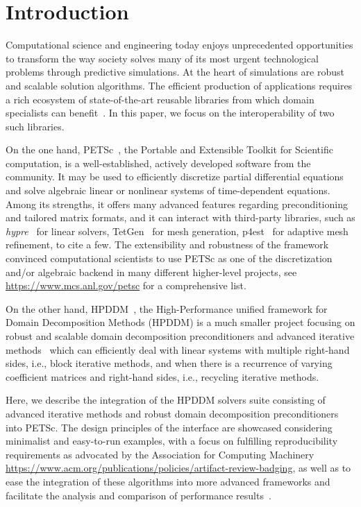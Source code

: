 \documentclass[3p,11pt]{elsarticle}
\begin{document}
\linenumbers
{}
\section{Introduction}
Computational science and engineering today enjoys unprecedented opportunities to transform
the way society solves many of its most urgent technological problems through predictive simulations.
At the heart of simulations are robust and scalable solution algorithms. The efficient
production of applications requires a rich ecosystem of state-of-the-art
reusable libraries from which domain
specialists can benefit~\cite{Bartlett:2017:XFT}. In this paper, we focus on the interoperability of two such
libraries.

On the one hand, PETSc~\cite{petsc-web-page,petsc-user-ref}, the
Portable and Extensible Toolkit for Scientific computation, is a
well-established, actively developed software from the community. It may be used to efficiently
discretize partial differential equations and solve algebraic linear or
nonlinear systems of time-dependent equations. Among its strengths, it offers many
advanced features regarding preconditioning and tailored matrix formats, and it can
interact with third-party libraries, such as
\emph{hypre}~\cite{falgout2002hypre} for linear solvers, TetGen~\cite{si2013tet}
for mesh generation, p4est~\cite{BursteddeWilcoxGhattas11} for adaptive mesh
refinement, to cite a few. The extensibility and robustness of the framework
convinced computational scientists to use PETSc as one of the discretization and/or algebraic backend in
many different higher-level projects, see \url{https://www.mcs.anl.gov/petsc} for a comprehensive list.

On the other hand, HPDDM~\cite{jolivet2013scalable}, the High-Performance unified framework for Domain Decomposition Methods (HPDDM)
is a much smaller project focusing on robust and scalable domain decomposition
preconditioners and advanced iterative
methods~\cite{jolivet2016block} which can efficiently deal with linear
systems with multiple right-hand sides, i.e., block iterative methods,
and when there is a recurrence of varying coefficient matrices and right-hand
sides, i.e., recycling iterative methods.

Here, we describe the integration of the HPDDM solvers suite consisting of advanced iterative
methods and robust domain decomposition preconditioners into PETSc.
The design principles of the interface are showcased considering %
minimalist and easy-to-run examples, with a focus on fulfilling reproducibility requirements as advocated by the
Association for Computing Machinery
\url{https://www.acm.org/publications/policies/artifact-review-badging}, as well as to 
ease the integration of these algorithms into more advanced frameworks
and facilitate the analysis and comparison of performance results~\cite{hoefler2015scientific}.
\end{document}

